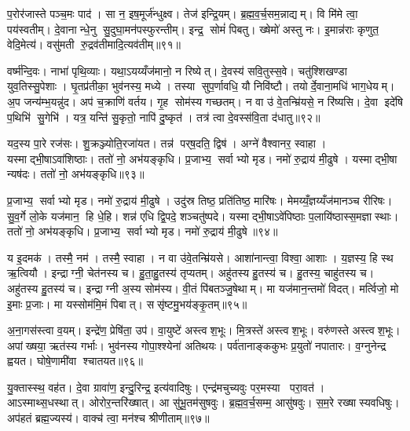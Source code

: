 प॒रोर॑जास्ते पञ्च॒मः पाद॑। सा न॒ इष॒मूर्ज॑न्धुक्ष्व। तेज॑ इन्द्रि॒यम्। ब्र॒ह्म॒व॒र्च॒सम॒न्नाद्यम्। वि मि॑मे त्वा॒ पय॑स्वतीम्। दे॒वानान्धे॒नु सु॒दुघा॒मन॑पस्फुरन्तीम्। इन्द्र॒ सोमं॑ पिबतु। ख्षेमो॑ अस्तु नः। इ॒मान्न॑राः कृणुत॒ वेदि॒मेत्य॑। वसु॑मती रु॒द्रव॑तीमादि॒त्यव॑तीम्॥९१॥

वर्ष्म॑न्दि॒वः। नाभा॑ पृथि॒व्याः। यथा॒ऽयय्यँज॑मानो॒ न रिष्येत्। दे॒वस्य॑ सवि॒तुस्स॒वे। चतु॑श्शिखण्डा युव॒तिस्सु॒पेशाः। घृ॒तप्र॑तीका॒ भुव॑नस्य॒ मध्ये। तस्या सुप॒र्णावधि॒ यौ निवि॑ष्टौ। तयोर्दे॒वाना॒मधि॑ भाग॒धेयम्। अ॒प जन्य॑म्भ॒यन्नु॑द। अप॑ च॒क्राणि॑ वर्तय। गृ॒ह सोम॑स्य गच्छतम्। न वा उ॑ वे॒तन्म्रि॑यसे॒ न रि॑ष्यसि। दे॒वा इदे॑षि प॒थिभि॑ सु॒गेभि॑। यत्र॒ यन्ति॑ सु॒कृतो॒ नापि॑ दु॒ष्कृत॑। तत्र॑ त्वा दे॒वस्स॑वि॒ता द॑धातु॥९२॥\anuvakamend[ब्रह्म॑णो॒ योनि॒रह॑सः प॒ङ्क्तिं प्रप॑द्ये दी॒ख्षा यया॑ऽऽदि॒त्यो दी॒ख्षया॑ दीख्षि॒तस्तया त्वा दी॒ख्षया॑ दीख्षया॒म्योष॑धयो दी॒ख्षा द्यौस्त्वा॒ दीख्ष॑माण॒मनु॑ दीख्षता॒मप॑चिति॒श्चाख्षि॑ति॒रुत्त॑रस्मिन्गमेय॒न्दिश॒ पाद॑ आदि॒त्यव॑तीव्वँर्तय॒ पञ्च॑ च]

यद॒स्य पा॒रे रज॑सः। शु॒क्रञ्ज्योति॒रजा॑यत। तन्न॑ पर्‌ष॒दति॒ द्विष॑। अग्ने॑ वैश्वानर॒ स्वाहा। यस्माद्भी॒षाऽवा॑शिष्ठाः। ततो॑ नो॒ अभ॑यङ्कृधि। प्र॒जाभ्य॒ सर्वाभ्यो मृड। नमो॑ रु॒द्राय॑ मी॒ढुषे। यस्माद्भी॒षा न्यष॑दः। ततो॑ नो॒ अभ॑यङ्कृधि॥९३॥

प्र॒जाभ्य॒ सर्वाभ्यो मृड। नमो॑ रु॒द्राय॑ मी॒ढुषे। उदु॑स्र तिष्ठ॒ प्रति॑तिष्ठ॒ मारि॑षः। मेमय्यँ॒ज्ञय्यँज॑मानञ्च रीरिषः। सु॒व॒र्गे लो॒के यज॑मान॒ हि धे॒हि। शन्न॑ एधि द्वि॒पदे॒ शञ्चतु॑ष्पदे। यस्माद्भी॒षाऽवे॑पिष्ठाः प॒लायि॑ष्ठास्स॒मज्ञास्थाः। ततो॑ नो॒ अभ॑यङ्कृधि। प्र॒जाभ्य॒ सर्वाभ्यो मृड। नमो॑ रु॒द्राय॑ मी॒ढुषे॥९४॥

य इ॒दमक॑। तस्मै॒ नम॑। तस्मै॒ स्वाहा। न वा उ॑वे॒तन्म्रि॑यसे। आशा॑नान्त्वा॒ विश्वा॒ आशाः। य॒ज्ञस्य॒ हि स्थ ऋ॒त्वियौ। इन्द्राग्नी॒ चेत॑नस्य च। हु॒ता॒हु॒तस्य॑ तृप्यतम्। अहु॑तस्य हु॒तस्य॑ च। हु॒तस्य॒ चाहु॑तस्य च। अहु॑तस्य हु॒तस्य॑ च। इन्द्राग्नी अ॒स्य सोम॑स्य। वी॒तं पि॑बतञ्जु॒षेथाम्। मा यज॑मान॒न्तमो॑ विदत्। मर्त्विजो॒ मो इ॒माः प्र॒जाः। मा यस्सोम॑मि॒मं पिबात्। ससृ॑ष्टमु॒भय॑ङ्कृ॒तम्॥९५॥\anuvakamend[कृ॒धि॒ मी॒ढुषेऽहु॑तस्य च स॒प्त च॑]

अ॒ना॒गस॑स्त्वा व॒यम्। इन्द्रे॑ण॒ प्रेषि॑ता॒ उप॑। वा॒युष्टे॑ अस्त्वश॒भूः। मि॒त्रस्ते॑ अस्त्वश॒भूः। वरु॑णस्ते अस्त्वश॒भूः। अपांख्षया॒ ऋत॑स्य गर्भाः। भुव॑नस्य गोपा॒श्श्येना॑ अतिथयः। पर्व॑तानाङ्ककुभः प्र॒युतो॑ नपातारः। व॒ग्नुनेन्द्र ह्वयत। घोषे॒णामी॑वा श्चातयत॥९६॥

यु॒क्तास्स्थ॒ वह॑त। दे॒वा ग्रावा॑ण॒ इन्दु॒रिन्द्र॒ इत्य॑वादिषुः। एन्द्र॑मचुच्यवुः पर॒मस्या परा॒वत॑। आऽस्माथ्स॒धस्थात्। ओरोर॒न्तरि॑ख्षात्। आ सु॑भू॒तम॑सुषवुः। ब्र॒ह्म॒व॒र्च॒सम्म॒ आसु॑षवुः। स॒म॒रे रख्षास्यवधिषुः। अप॑हतं ब्रह्म॒ज्यस्य॑। वाक्च॑ त्वा॒ मन॑श्च श्रीणीताम्॥९७॥

